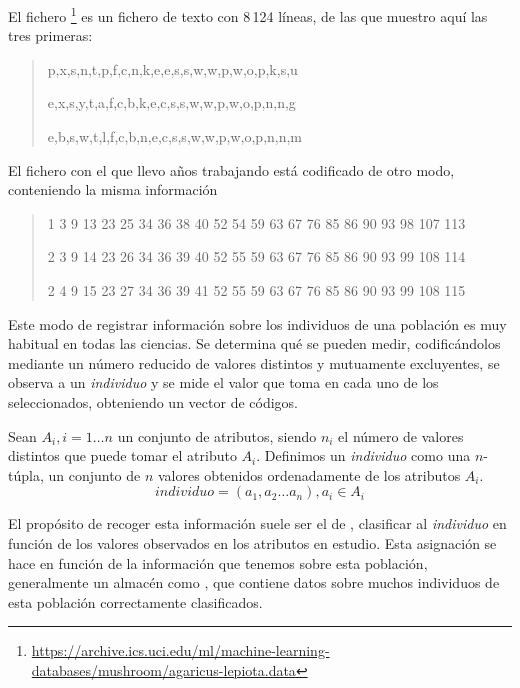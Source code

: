 \noindent El fichero \mushroom\footnote{\url{https://archive.ics.uci.edu/ml/machine-learning-databases/mushroom/agaricus-lepiota.data}} es un fichero de texto con 8\,124 líneas, de las que muestro aquí las tres primeras:
\begin{quote}
   \footnotesize
   p,x,s,n,t,p,f,c,n,k,e,e,s,s,w,w,p,w,o,p,k,s,u
   
   e,x,s,y,t,a,f,c,b,k,e,c,s,s,w,w,p,w,o,p,n,n,g
   
   e,b,s,w,t,l,f,c,b,n,e,c,s,s,w,w,p,w,o,p,n,n,m
\end{quote}

\noindent El fichero \mushroom con el que llevo años trabajando está codificado de otro modo, conteniendo la misma información
\begin{quote}
   \footnotesize
   1 3 9 13 23 25 34 36 38 40 52 54 59 63 67 76 85 86 90 93 98 107 113
   
   2 3 9 14 23 26 34 36 39 40 52 55 59 63 67 76 85 86 90 93 99 108 114
   
   2 4 9 15 23 27 34 36 39 41 52 55 59 63 67 76 85 86 90 93 99 108 115
\end{quote}

Este modo de registrar información sobre los individuos de una población es muy habitual en todas las ciencias. Se determina qué \atributos se pueden medir, codificándolos mediante un número reducido de valores distintos y mutuamente excluyentes, se observa a un \emph{individuo} y se mide el valor que toma en cada uno de los \atributos seleccionados, obteniendo un vector de códigos.

\begin{Definition}[Individuo]
   Sean $A_i, i = 1 \ldots n$ un conjunto de atributos, siendo $n_i$ el número de valores distintos que puede tomar el atributo $A_i$. Definimos un \emph{individuo} como una $n$-túpla, un conjunto de $n$ valores obtenidos ordenadamente de los atributos $A_i$.
   $$individuo = \left(a_1, a_2\ldots a_n\right), a_i \in A_i$$
\label{def:individuo}
\end{Definition}

El propósito de recoger esta información suele ser el de \clasificacion, clasificar al \emph{individuo} en función de los valores observados en los atributos en estudio. Esta asignación se hace en función de la información que tenemos sobre esta población, generalmente un almacén \D como \mushroom, que contiene datos sobre muchos individuos de esta población correctamente clasificados.

